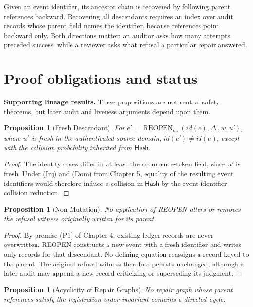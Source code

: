 \documentclass[11pt,openany]{book}
\newtheorem{proposition}[definition]{Proposition}
\newcommand{\Hash}{\mathsf{Hash}}
\begin{document}
Given an event identifier, its ancestor chain is recovered by following parent
references backward. Recovering all descendants requires an index over audit
records whose parent field names the identifier, because references point
backward only. Both directions matter: an auditor asks how many attempts
preceded success, while a reviewer asks what refusal a particular repair
answered.

\section{Proof obligations and status}

\textbf{Supporting lineage results.} These propositions are not central safety
theorems, but later audit and liveness arguments depend upon them.

\begin{proposition}[Fresh Descendant]
For
\(e'=\operatorname{REOPEN}_{\nu_R}(id(e),\Delta',w,u')\), where \(u'\) is
fresh in the authenticated source domain, \(id(e')\neq id(e)\), except with
the collision probability inherited from \(\Hash\).
\end{proposition}

\begin{proof}
The identity cores differ in at least the occurrence-token field, since \(u'\)
is fresh. Under (Inj) and (Dom) from Chapter 5, equality of the resulting event
identifiers would therefore induce a collision in \(\Hash\) by the
event-identifier collision reduction.
\end{proof}

\begin{proposition}[Non-Mutation]
No application of REOPEN alters or removes the refusal witness originally
written for its parent.
\end{proposition}

\begin{proof}
By premise (P1) of Chapter 4, existing ledger records are never overwritten.
REOPEN constructs a new event with a fresh identifier and writes only records
for that descendant. No defining equation reassigns a record keyed to the
parent. The original refusal witness therefore persists unchanged, although a
later audit may append a new record criticizing or superseding its judgment.
\end{proof}

\begin{proposition}[Acyclicity of Repair Graphs]
No repair graph whose parent references satisfy the registration-order
invariant contains a directed cycle.
\end{proposition}
\end{document}
